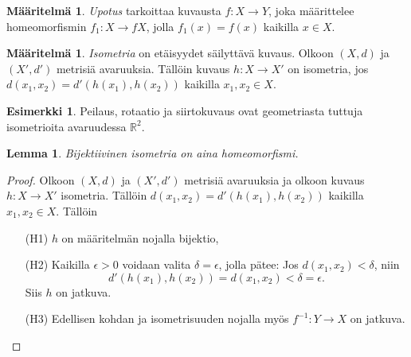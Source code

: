 \documentclass[12pt,a4paper,leqno]{report}
\newcommand{\R}{\mathbb{R}}
\theoremstyle{plain}
\newtheorem{lem}[equation]{Lemma}
\theoremstyle{definition}
\newtheorem{maar}[equation]{Määritelmä}
\newtheorem{esim}[equation]{Esimerkki}
\theoremstyle{remark}
\begin{document}
\begin{maar}\emph{Upotus} 
tarkoittaa kuvausta $f\colon X\rightarrow Y$, joka määrittelee homeomorfismin $f_1\colon X\rightarrow fX$, jolla $f_1(x)=f(x)$ kaikilla $x\in X$. %
\end{maar}
\begin{maar}\emph{Isometria}
 on etäisyydet säilyttävä kuvaus. Olkoon $(X,d)$ ja $(X',d')$ metrisiä avaruuksia. %
Tällöin kuvaus $h\colon X\rightarrow X'$ on isometria, jos $d(x_1,x_2)=d'(h(x_1),h(x_2))$ kaikilla $x_1,x_2 \in X$.
\end{maar}
%
\begin{esim}
Peilaus, rotaatio ja siirtokuvaus ovat geometriasta tuttuja isometrioita avaruudessa $\R^2$.
\end{esim}
\begin{lem}\label{isolemma} Bijektiivinen isometria on aina homeomorfismi.
\end{lem}
\begin{proof}
Olkoon $(X,d)$ ja $(X',d')$ metrisiä avaruuksia ja olkoon kuvaus $h\colon X\rightarrow X'$ isometria. Tällöin $d(x_1,x_2)=d'(h(x_1),h(x_2))$ kaikilla $x_1,x_2 \in X$. Tällöin
\begin{itemize}
\item[(H1)] $h$ on määritelmän nojalla bijektio,
\item[(H2)] Kaikilla $\epsilon>0$ voidaan valita $\delta=\epsilon$, jolla pätee: Jos $d(x_1,x_2)<\delta$, niin 
$$d'(h(x_1),h(x_2))=d(x_1,x_2)<\delta=\epsilon.$$
Siis $h$ on jatkuva.
\item[(H3)] Edellisen kohdan ja isometrisuuden nojalla myös $f^{-1} \colon Y\rightarrow X$ on jatkuva. 
\end{itemize}
\end{proof}
\end{document}
